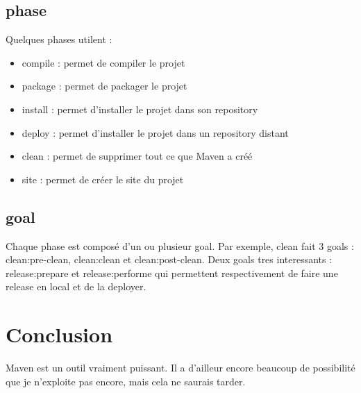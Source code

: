 \documentclass[a4paper,10pt]{article}
\begin{document}
\subsection{phase}
Quelques phases utilent :
\begin{itemize}
\item compile : permet de compiler le projet
\item package : permet de packager le projet
\item install : permet d'installer le projet dans son repository
\item deploy : permet d'installer le projet dans un repository distant
\item clean : permet de supprimer tout ce que Maven a créé
\item site : permet de créer le site du projet
\end{itemize}

\subsection{goal}
Chaque phase est composé d'un ou plusieur goal.
Par exemple, clean fait 3 goals : clean:pre-clean, clean:clean et clean:post-clean.
Deux goals tres interessants : release:prepare et release:performe qui permettent respectivement de faire une release en local et de la deployer. 

\section{Conclusion}
Maven est un outil vraiment puissant. Il a d'ailleur encore beaucoup de possibilité que je n'exploite pas encore, mais cela ne saurais tarder.
\end{document}
